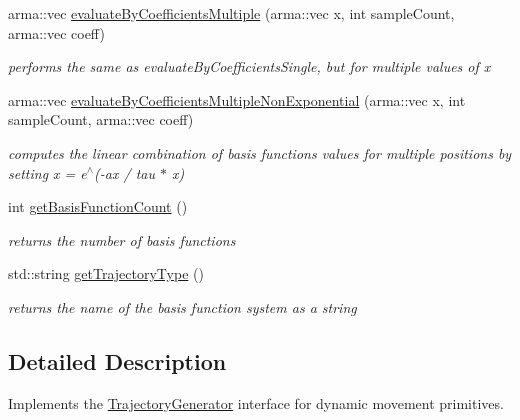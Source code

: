 \begin{DoxyCompactItemize}
arma\-::vec \hyperlink{classkukadu_1_1DMPTrajectoryGenerator_affb281e54fbddd566338d3c8e826bd40}{evaluate\-By\-Coefficients\-Multiple} (arma\-::vec x, int sample\-Count, arma\-::vec coeff)
\begin{DoxyCompactList}\small\item\em performs the same as evaluate\-By\-Coefficients\-Single, but for multiple values of x \end{DoxyCompactList}\item 
arma\-::vec \hyperlink{classkukadu_1_1DMPTrajectoryGenerator_a759b1a5b259bcc7ab26554232f94a393}{evaluate\-By\-Coefficients\-Multiple\-Non\-Exponential} (arma\-::vec x, int sample\-Count, arma\-::vec coeff)
\begin{DoxyCompactList}\small\item\em computes the linear combination of basis functions values for multiple positions by setting x = e$^\wedge$(-\/ax / tau $\ast$ x) \end{DoxyCompactList}\item 
\hypertarget{classkukadu_1_1DMPTrajectoryGenerator_a2554959c04ce802829324fced3bb872b}{int \hyperlink{classkukadu_1_1DMPTrajectoryGenerator_a2554959c04ce802829324fced3bb872b}{get\-Basis\-Function\-Count} ()}\label{classkukadu_1_1DMPTrajectoryGenerator_a2554959c04ce802829324fced3bb872b}

\begin{DoxyCompactList}\small\item\em returns the number of basis functions \end{DoxyCompactList}\item 
\hypertarget{classkukadu_1_1DMPTrajectoryGenerator_a9b6535bbc5e82c84238ebe41f04bca3f}{std\-::string \hyperlink{classkukadu_1_1DMPTrajectoryGenerator_a9b6535bbc5e82c84238ebe41f04bca3f}{get\-Trajectory\-Type} ()}\label{classkukadu_1_1DMPTrajectoryGenerator_a9b6535bbc5e82c84238ebe41f04bca3f}

\begin{DoxyCompactList}\small\item\em returns the name of the basis function system as a string \end{DoxyCompactList}\end{DoxyCompactItemize}


\subsection{Detailed Description}
Implements the \hyperlink{classkukadu_1_1TrajectoryGenerator}{Trajectory\-Generator} interface for dynamic movement primitives. 

